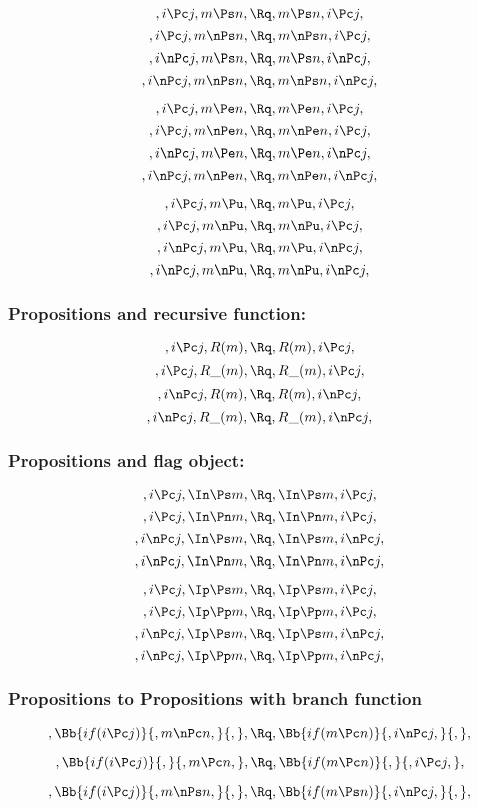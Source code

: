 \[,i \Pc j, m \Ps n, \Rq , m \Ps n, i \Pc j,\]
\[,i \Pc j, m \nPs n, \Rq , m \nPs n, i \Pc j,\]
\[,i \nPc j, m \Ps n, \Rq , m \Ps n, i \nPc j,\]
\[,i \nPc j, m \nPs n, \Rq , m \nPs n, i \nPc j,\]


\[,i \Pc j, m \Pe n, \Rq , m \Pe n, i \Pc j,\]
\[,i \Pc j, m \nPe n, \Rq , m \nPe n, i \Pc j,\]
\[,i \nPc j, m \Pe n, \Rq , m \Pe n, i \nPc j,\]
\[,i \nPc j, m \nPe n, \Rq , m \nPe n, i \nPc j,\]

\[,i \Pc j, m \Pu, \Rq , m \Pu, i \Pc j,\]
\[,i \Pc j, m \nPu, \Rq , m \nPu, i \Pc j,\]
\[,i \nPc j, m \Pu, \Rq , m \Pu, i \nPc j,\]
\[,i \nPc j, m \nPu, \Rq , m \nPu, i \nPc j,\]



\bigskip
\bigskip
\bigskip
\bigskip
\subsubsection{ Propositions and recursive function:}
\[,i \Pc j, R(m), \Rq , R(m), i \Pc j,\]
\[,i \Pc j, R\_(m), \Rq , R\_(m), i \Pc j,\]
\[,i \nPc j,R(m), \Rq , R(m), i \nPc j,\]
\[,i \nPc j, R\_(m), \Rq , R\_(m), i \nPc j,\]



\bigskip
\bigskip
\bigskip
\bigskip
\subsubsection{ Propositions and flag object:}
\[,i \Pc j, \In \Ps m, \Rq , \In \Ps m, i \Pc j,\]
\[,i \Pc j, \In \Pn m, \Rq , \In \Pn m, i \Pc j,\]
\[,i \nPc j,\In \Ps m, \Rq , \In \Ps m, i \nPc j,\]
\[,i \nPc j, \In \Pn m, \Rq , \In \Pn m, i \nPc j,\]

\[,i \Pc j, \Ip \Ps m, \Rq , \Ip \Ps m, i \Pc j,\]
\[,i \Pc j, \Ip \Pp m, \Rq , \Ip \Pp m, i \Pc j,\]
\[,i \nPc j,\Ip \Ps m, \Rq , \Ip \Ps m, i \nPc j,\]
\[,i \nPc j, \Ip \Pp m, \Rq , \Ip \Pp m, i \nPc j,\]



\bigskip
\bigskip
\bigskip
\bigskip
\subsubsection{ Propositions to Propositions with branch function}
\[, \Bb{if(i \Pc j)}{,m \nPc n,}{,}, \Rq , \Bb{if(m \Pc n)}{,i \nPc j,}{,},\]

\bigskip
\bigskip
\[, \Bb{if(i \Pc j)}{,}{,m \Pc n,}, \Rq , \Bb{if(m \Pc n)}{,}{,i \Pc j,},\]


\bigskip
\bigskip
\[, \Bb{if(i \Pc j)}{,m \nPs n,}{,}, \Rq , \Bb{if(m \Ps n)}{,i \nPc j,}{,},\]

